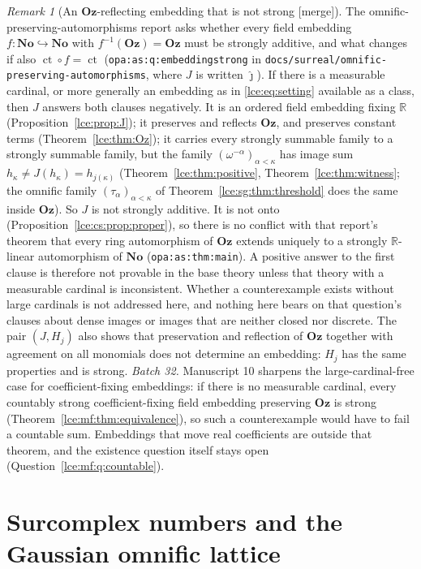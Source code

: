 \documentclass[11pt,letterpaper]{article}
\numberwithin{equation}{section}
\theoremstyle{definition}
\theoremstyle{remark}
\newtheorem{remark}[theorem]{Remark}
\newcommand{\No}{\mathbf{No}}
\newcommand{\Oz}{\mathbf{Oz}}
\newcommand{\R}{\mathbb R}
\newcommand{\ct}{\operatorname{ct}}
\newcommand{\thref}[1]{Theorem~\ref{#1}}
\newcommand{\prref}[1]{Proposition~\ref{#1}}
\newcommand{\mergetag}{\textup{\textsf{\small[merge]}}}%
\newcommand{\lbl}[1]{\nolinkurl{#1}}%
\newcommand{\fn}[1]{\nolinkurl{#1}}%
\begin{document}
\begin{remark}[An $\Oz$-reflecting embedding that is not strong \mergetag]
\label{lce:rem:opa}
The omnific-preserving-automorphisms report asks whether every field
embedding $f:\No\hookrightarrow\No$ with $f^{-1}(\Oz)=\Oz$ must be strongly
additive, and what changes if also $\ct\circ f=\ct$
(\lbl{opa:as:q:embeddingstrong} in
\fn{docs/surreal/omnific-preserving-automorphisms}, where $J$ is written
$\hat\jmath$). If there is a measurable cardinal, or more generally an
embedding as in \eqref{lce:eq:setting} available as a class, then $J$
answers both clauses negatively. It is an ordered field embedding fixing
$\R$ (\prref{lce:prop:J}); it preserves and reflects $\Oz$, and preserves
constant terms (\thref{lce:thm:Oz}); it carries every strongly summable
family to a strongly summable family, but the family
$(\omega^{-\alpha})_{\alpha<\kappa}$ has image sum $h_\kappa\ne
J(h_\kappa)=h_{j(\kappa)}$ (\thref{lce:thm:positive}, \thref{lce:thm:witness};
the omnific family $(\tau_\alpha)_{\alpha<\kappa}$ of
\thref{lce:sg:thm:threshold} does the same inside $\Oz$). So $J$ is not
strongly additive. It is not onto (\prref{lce:cs:prop:proper}), so there is
no conflict with that report's theorem that every ring automorphism of
$\Oz$ extends uniquely to a strongly $\R$-linear automorphism of $\No$
(\lbl{opa:as:thm:main}). A positive answer to the first clause is therefore
not provable in the base theory unless that theory with a measurable
cardinal is inconsistent. Whether a counterexample exists without large
cardinals is not addressed here, and nothing here bears on that
question's clauses about dense images or images that are neither closed nor
discrete. The pair $(J,H_j)$ also shows that preservation and reflection of
$\Oz$ together with agreement on all monomials does not determine an
embedding: $H_j$ has the same properties and is strong.
\emph{Batch 32.} Manuscript 10 sharpens the large-cardinal-free case for
coefficient-fixing embeddings: if there is no measurable cardinal, every
countably strong coefficient-fixing field embedding preserving $\Oz$ is
strong (\thref{lce:mf:thm:equivalence}), so such a counterexample would have
to fail a countable sum. Embeddings that move real coefficients are outside
that theorem, and the existence question itself stays open
(Question~\ref{lce:mf:q:countable}).
\end{remark}

\section{Surcomplex numbers and the Gaussian omnific lattice}\label{lce:sec:complex}
\end{document}
